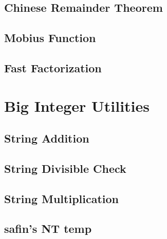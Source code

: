 \subsection{Chinese Remainder Theorem}

\subsection{Mobius Function}

\subsection{Fast Factorization}

\section{Big Integer Utilities}

\subsection{String Addition}

\subsection{String Divisible Check}

\subsection{String Multiplication}

\subsection{safin's NT temp}



